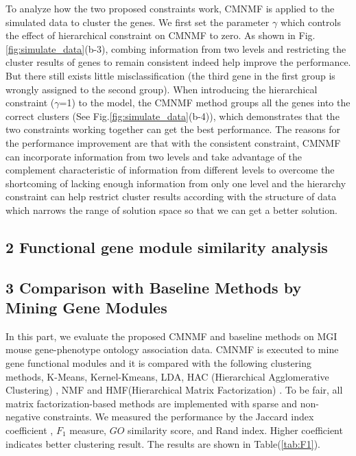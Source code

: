 \documentclass{bmcart}
\begin{document}
To analyze how the two proposed constraints work, CMNMF is applied to the simulated data to cluster the genes. We first set the parameter $\gamma$ which controls the effect of hierarchical constraint on CMNMF to zero. As shown in Fig.\ref{fig:simulate_data}(b-3), combing information from two levels and restricting the cluster results of genes to remain consistent indeed help improve the performance. But there still exists little misclassification (the third gene in the first group is wrongly assigned to the second group). When introducing the hierarchical constraint ($\gamma$=1) to the model, the CMNMF method groups all the genes into the correct clusters (See Fig.\ref{fig:simulate_data}(b-4)), which demonstrates that the two constraints working together can get the best performance. The reasons for the performance improvement are that with the consistent constraint, CMNMF can incorporate information from two levels and take advantage of the complement characteristic of information from different levels to overcome the shortcoming of lacking enough information from only one level and the hierarchy constraint can help restrict cluster results according with the structure of data which narrows the range of solution space so that we can get a better solution.

\subsection*{\textbf{2 Functional gene module similarity analysis}}

\subsection*{\textbf{3 Comparison with Baseline Methods by Mining Gene Modules}}
In this part, we evaluate the proposed CMNMF and baseline methods on MGI mouse gene-phenotype ontology association data.
CMNMF is executed to mine gene functional modules and it is compared with the following clustering methods, K-Means, Kernel-Kmeans, LDA, HAC (Hierarchical Agglomerative Clustering) \cite{HAC}, NMF and HMF(Hierarchical Matrix Factorization) \cite{HMF}. To be fair, all matrix factorization-based methods are implemented with sparse and non-negative constraints. We measured the performance by the Jaccard index coefficient \cite{cluster_survey}, $F_1$ measure, $GO$ similarity score, and Rand index. Higher coefficient indicates better clustering result. The results are shown in Table(\ref{tab:F1}).
\end{document}
